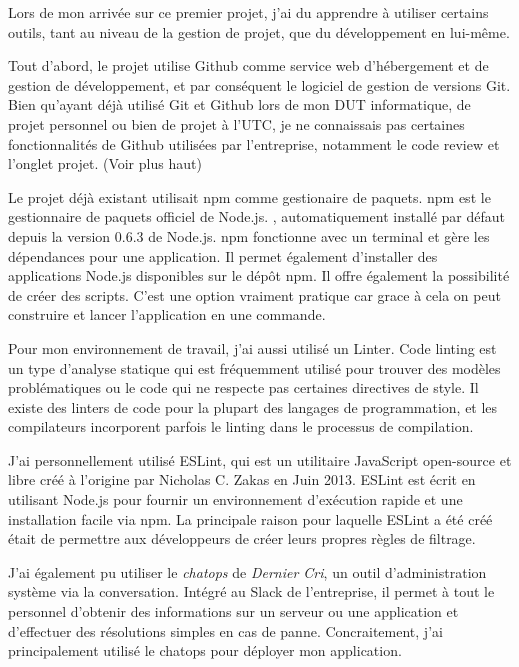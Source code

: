 \documentclass[12pt,a4paper]{article}
\begin{document}
  \bigskip

  Lors de mon arrivée sur ce premier projet, j'ai du apprendre à utiliser
  certains outils, tant au niveau de la gestion de projet, que du
  développement en lui-même.

  \bigskip

  Tout d'abord, le projet utilise Github comme service web d'hébergement
  et de gestion de développement, et par conséquent le logiciel de gestion
  de versions Git. Bien qu'ayant déjà utilisé Git et Github lors de mon
  DUT informatique, de projet personnel ou bien de projet à l'UTC, je ne
  connaissais pas certaines fonctionnalités de Github utilisées par
  l'entreprise, notamment le code review et l'onglet projet. (Voir plus
  haut)

  \bigskip

  Le projet déjà existant utilisait npm comme gestionaire de paquets. npm
  est le gestionnaire de paquets officiel de Node.js. , automatiquement
  installé par défaut depuis la version 0.6.3 de Node.js. npm fonctionne
  avec un terminal et gère les dépendances pour une application. Il permet
  également d'installer des applications Node.js disponibles sur le dépôt
  npm. Il offre également la possibilité de créer des scripts. C'est une
  option vraiment pratique car grace à cela on peut construire et lancer
  l'application en une commande.

  \bigskip

  Pour mon environnement de travail, j'ai aussi utilisé un Linter. Code
  linting est un type d'analyse statique qui est fréquemment utilisé pour
  trouver des modèles problématiques ou le code qui ne respecte pas
  certaines directives de style. Il existe des linters de code pour la
  plupart des langages de programmation, et les compilateurs incorporent
  parfois le linting dans le processus de compilation.

  \bigskip

  J'ai personnellement utilisé ESLint, qui est un utilitaire JavaScript
  open-source et libre créé à l'origine par Nicholas C. Zakas en Juin
  2013. ESLint est écrit en utilisant Node.js pour fournir un
  environnement d'exécution rapide et une installation facile via npm. La
  principale raison pour laquelle ESLint a été créé était de permettre aux
  développeurs de créer leurs propres règles de filtrage.

  \bigskip

  J'ai également pu utiliser le \emph{chatops} de \emph{Dernier Cri}, un
  outil d'administration système via la conversation. Intégré au Slack de
  l'entreprise, il permet à tout le personnel d'obtenir des informations
  sur un serveur ou une application et d'effectuer des résolutions simples
  en cas de panne. Concraitement, j'ai principalement utilisé le chatops
  pour déployer mon application.
\end{document}

